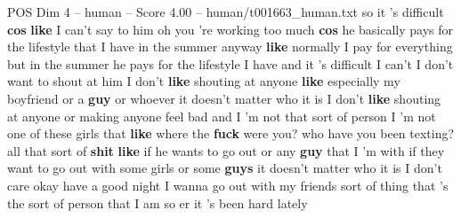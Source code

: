 \begin{textsample}{POS Dim 4 – human – Score 4.00 – human/t001663\_human.txt}  \label{ex:f4_pos_003}
so it 's difficult \textbf{cos} \textbf{like} I can't say to him oh you 're working too much \textbf{cos} he basically pays for the lifestyle that I have in the summer anyway \textbf{like} normally I pay for everything but in the summer he pays for the lifestyle I have and it 's difficult I can't I don't want to shout at him I don't \textbf{like} shouting at anyone \textbf{like} especially my boyfriend or a \textbf{guy} or whoever it doesn't matter who it is I don't \textbf{like} shouting at anyone or making anyone feel bad and I 'm not that sort of person I 'm not one of these girls that \textbf{like} where the \textbf{fuck} were you? who have you been texting? all that sort of \textbf{shit} \textbf{like} if he wants to go out or any \textbf{guy} that I 'm with if they want to go out with some girls or some \textbf{guys} it doesn't matter who it is I don't care okay have a good night I wanna go out with my friends sort of thing that 's the sort of person that I am so er it 's been hard lately

\end{textsample}
